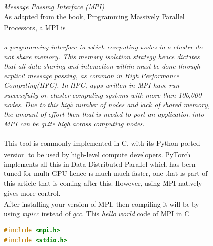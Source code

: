 \documentclass[12pt]{article}
\newcommand{\customtext}[3]{%
    \vspace{#2} %
    \fontsize{13}{8}\textcolor{#1}{\textit{#3}}%
}
\newcommand{\sidecite}[1]{\textsuperscript{\textcolor{blue}{\textbf{\scriptsize#1}}}}
\newcommand{\maincitecount}{\sidecite{\stepcounter{maincite}\themaincite}}
\begin{document}
\begin{figure}[!htb]
    \begin{minipage}[t]{0.65\textwidth}
    \customtext{xtitle}{0em}{Message Passing Interface (MPI)}\\
    As adapted from the book, Programming Massively Parallel Processors\maincitecount, a MPI is\\
    \vspace{0.4em}\\
    {\it \small a programming interface in which computing nodes in a cluster do not share memory.
    This memory isolation strategy hence dictates that all data sharing and interaction within must 
    be done through explicit message passing, as common in High Performance Computing(HPC).
    In HPC, apps written in MPI have run successfully on cluster computing systems with 
    more than 100,000 nodes. Due to this high number of nodes and lack of shared memory, the 
    amount of effort then that is needed to port an application into MPI can be quite high 
    across computing nodes.}\\
    \vspace{0.4em}\\
    This tool is commonly implemented in C, with its Python ported version\maincitecount\ to be 
    used by high-level compute developers. PyTorch implements all this in Data Distributed Parallel 
    which has been tuned for multi-GPU hence is much much faster, one that is part of this article 
    that is coming after this. However, using MPI natively gives more control.\\
    After installing your version of MPI\maincitecount, then compiling it will be by using 
    {\it \color{xtitle}mpicc} instead of {\it \color{xtitle}gcc}. This {\it hello world} code of MPI
    in C
\begin{lstlisting}[language=c,style=c,basicstyle=\ttfamily\footnotesize]
#include <mpi.h>
#include <stdio.h>


\end{lstlisting}
\end{minipage}
\end{figure}
\end{document}
